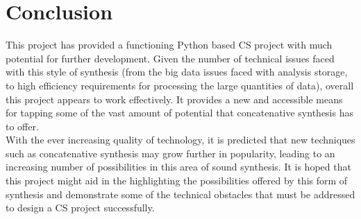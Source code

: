 \documentclass{scrartcl}
\begin{document}
    \section*{Conclusion}
    This project has provided a functioning Python based CS project with much
    potential for further development. Given the number of technical issues
    faced with this style of synthesis (from the big data issues faced with
    analysis storage, to high efficiency requirements for processing the large
    quantities of data), overall this project appears to work effectively. It
    provides a new and accessible means for tapping some of the vast amount of
    potential that concatenative synthesis has to offer.\\ 
    With the ever increasing quality of technology, it is predicted that new
    techniques such as concatenative synthesis may grow further in popularity,
    leading to an increasing number of possibilities in this area of sound
    synthesis. It is hoped that this project might aid in the highlighting the
    possibilities offered by this form of synthesis and demonstrate some of the
    technical obstacles that must be addressed to design a CS project
    successfully.

    \pagebreak

    \printbibliography
\end{document}
